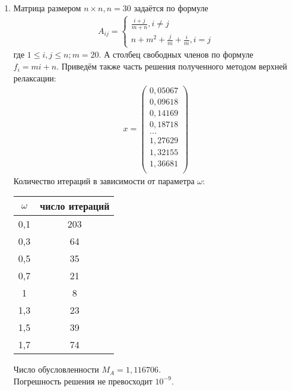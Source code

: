 \documentclass[a4paper,12pt,titlepage,finall]{article}
\begin{document}
\begin{enumerate}
\item
Матрица размером $n \times n, n = 30$ задаётся по формуле
\begin{align}
A_{ij} = \left\{
\begin{array}{ll}
\frac{i+j}{m+n}, i \neq j\\
n + m^2 + \frac{j}{m} + \frac{i}{m}, i = j
\end{array}
\right.
\end{align}
где $1 \leq i,j \leq n; m = 20$. А столбец свободных членов по формуле $f_i = mi + n$. Приведём также часть решения полученного методом верхней релаксации:
\begin{align*}
x = \begin{pmatrix}
0,05067 \\
   0,09618 \\
   0,14169 \\
   0,18718 \\
   ...\\
   1,27629 \\
   1,32155 \\
   1,36681 \\
\end{pmatrix}
\end{align*}
Количество итераций в зависимости от параметра $\omega$:
\begin{center}
\begin{tabular}{|c|c|}
\hline
$\omega$ & число итераций\\
\hline
0,1 & 203\\
0,3 & 64\\
0,5 & 35\\
0,7 & 21\\
 1 & 8\\
 1,3 & 23\\
 1,5 & 39\\
 1,7 & 74\\
 \hline
\end{tabular}
\end{center}

Число обусловленности $M_A = 1,116706$.\\
Погрешность решения не превосходит $10^{-9}$.


\end{enumerate}
\end{document}
